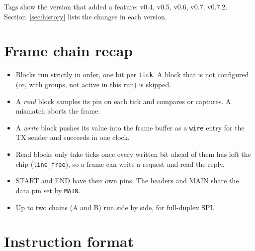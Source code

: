 \documentclass[11pt,a4paper]{article}
\newcommand{\new}{\textcolor{newc}{\textsf{\small v0.4}}}
\newcommand{\vfive}{\textcolor{fivec}{\textsf{\small v0.5}}}
\newcommand{\vsix}{\textcolor{sixc}{\textsf{\small v0.6}}}
\newcommand{\vseven}{\textcolor{sevenc}{\textsf{\small v0.7}}}
\newcommand{\vseventwo}{\textcolor{sevenc}{\textsf{\small v0.7.2}}}
\newcommand{\sig}[1]{\texttt{#1}}
\begin{document}
Tags show the version that added a feature: \new, \vfive, \vsix, \vseven, \vseventwo. Section~\ref{sec:history} lists the changes in each version.

\section{Frame chain recap}

\begin{center}
\end{center}

\begin{itemize}
\item Blocks run strictly in order, one bit per \sig{tick}. A block that is not configured (or, with groups, not active in this run) is skipped.
\item A \emph{read} block samples its pin on each tick and compares or captures. A mismatch aborts the frame.
\item A \emph{write} block pushes its value into the frame buffer as a \sig{wire} entry for the TX sender and succeeds in one clock.
\item Read blocks only take ticks once every written bit ahead of them has left the chip (\sig{line\_free}), so a frame can write a request and read the reply.
\item START and END have their own pins. The headers and MAIN share the data pin set by \sig{MAIN}.
\item Up to two chains (A and B) run side by side, for full-duplex SPI.
\end{itemize}

\section{Instruction format}
\end{document}
